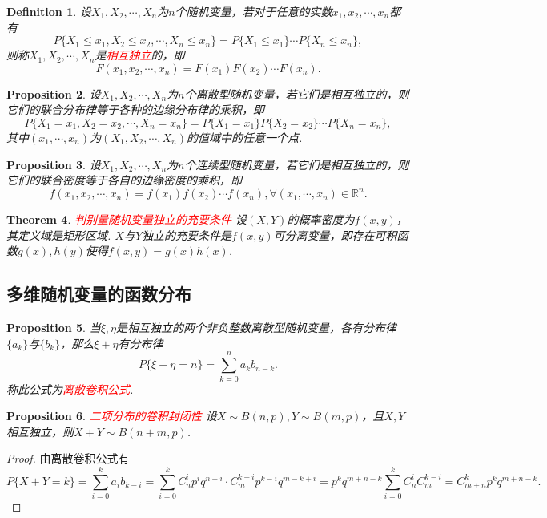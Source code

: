 \documentclass{article}
\newtheorem{theorem}{Theorem}[section]
\newtheorem{proposition}[theorem]{Proposition}
\newtheorem{definition}[theorem]{Definition}
\newcommand{\redt}[1]{\textcolor{red}{#1}}
\begin{document}
\begin{definition}
\rm 设$X_1,X_2,\cdots,X_n$为$n$个随机变量，若对于任意的实数$x_1,x_2,\cdots,x_n$都有
$$
P\{X_1 \leq x_1, X_2 \leq x_2 ,\cdots, X_n \leq x_n\} = P\{X_1 \leq x_1\} \cdots P\{X_n \leq x_n\},
$$
则称$X_1,X_2,\cdots,X_n$是\redt{相互独立}的，即
$$
F(x_1,x_2,\cdots,x_n) = F(x_1)F(x_2)\cdots F(x_n). 
$$
\end{definition}

\begin{proposition}
\rm 设$X_1,X_2,\cdots,X_n$为$n$个离散型随机变量，若它们是相互独立的，则它们的联合分布律等于各种的边缘分布律的乘积，即
$$
P\{X_1 = x_1, X_2 = x_2 , \cdots, X_n = x_n\} = P\{X_1 = x_1\}P\{X_2 = x_2\}\cdots P\{X_n = x_n\},
$$
其中$(x_1,\cdots,x_n)$为$(X_1,X_2,\cdots,X_n)$的值域中的任意一个点. 
\end{proposition}

\begin{proposition}
\rm 设$X_1,X_2,\cdots,X_n$为$n$个连续型随机变量，若它们是相互独立的，则它们的联合密度等于各自的边缘密度的乘积，即
$$
f(x_1,x_2,\cdots,x_n) = f(x_1)f(x_2)\cdots f(x_n), \forall (x_1,\cdots,x_n) \in \mathbb{R}^n.
$$
\end{proposition}

\begin{theorem}
\rm \redt{判别量随机变量独立的充要条件} 设$(X,Y)$的概率密度为$f(x,y)$，其定义域是矩形区域. $X$与$Y$独立的充要条件是$f(x,y)$可分离变量，即存在可积函数$g(x),h(y)$使得$f(x,y)=g(x)h(x)$. 
\end{theorem}

\subsection{多维随机变量的函数分布}

\begin{proposition}
\rm 当$\xi,\eta$是相互独立的两个非负整数离散型随机变量，各有分布律$\{a_k\}$与$\{b_k\}$，那么$\xi+\eta$有分布律
$$
P\{\xi+\eta = n\} = \sum\limits_{k=0}^n a_kb_{n-k}. 
$$
称此公式为\redt{离散卷积公式}.
\end{proposition}

\begin{proposition}
\rm \redt{二项分布的卷积封闭性} 设$X\sim B(n,p),Y\sim B(m,p)$，且$X,Y$相互独立，则$X+Y \sim B(n+m,p)$.
\end{proposition}

\begin{proof}
\rm 由离散卷积公式有
$$
P\{X+Y = k\} = \sum\limits_{i=0}^k a_ib_{k-i} = \sum\limits_{i=0}^k C_n^i p^iq^{n-i} \cdot C_m^{k-i}p^{k-i}q^{m-k+i} = p^{k}q^{m+n-k} \sum\limits_{i=0}^k C_n^i C_m^{k-i} = C_{m+n}^k p^{k}q^{m+n-k}. 
$$
\end{proof}
\end{document}
